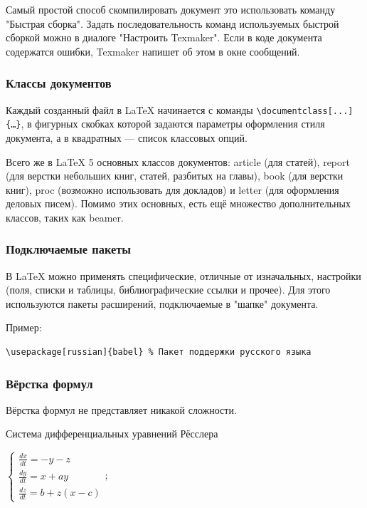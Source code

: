 \documentclass[a4paper, 12pt]{article}		%
\begin{document}
Самый простой способ скомпилировать документ это использовать команду "Быстрая сборка". Задать последовательность команд используемых быстрой сборкой можно в диалоге "Настроить Texmaker". Если в коде документа содержатся ошибки, Texmaker напишет об этом в окне сообщений.

\subsubsection{Классы документов}

Каждый созданный файл в \LaTeX{} начинается с команды \verb+\documentclass[...]{…}+, в фигурных скобках которой задаются параметры оформления стиля документа, а в квадратных — список классовых опций.

Всего же в \LaTeX{} 5 основных классов документов: article (для статей), report (для верстки небольших книг, статей, разбитых на главы), book (для верстки книг), proc (возможно использовать для докладов) и letter (для оформления деловых писем). Помимо этих основных, есть ещё множество дополнительных классов, таких как beamer.

\subsubsection{Подключаемые пакеты}

В \LaTeX{} можно применять специфические, отличные от изначальных, настройки (поля, списки и таблицы, библиографические ссылки и прочее). Для этого используются пакеты расширений, подключаемые в "шапке" документа.

Пример:
\begin{verbatim}\usepackage[russian]{babel} % Пакет поддержки русского языка
\end{verbatim}

\subsubsection{Вёрстка формул}

Вёрстка формул не представляет никакой сложности.

Система дифференциальных уравнений Рёсслера

\begin{center}
$\left \{ \begin{matrix} \frac{dx}{dt} = -y - z \\ \frac{dy}{dt} = x + ay \\ \frac{dz}{dt} = b + z(x-c) \end{matrix} \right.  ;$
\end{center}
\end{document}
